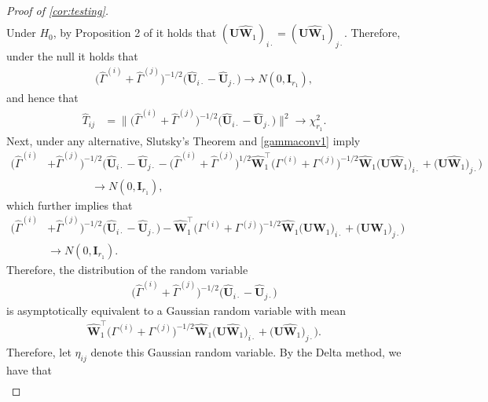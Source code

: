 \documentclass[10pt]{article}
\newcommand{\0}{{\mathbf{0}}}
\newcommand{\1}{{\mathbf{1}}}
\newcommand{\U}{{\mathbf{U}}}
\renewcommand{\citet}{\cite}
\renewcommand{\t}{^{\top}}
\newcommand{\uhat}{\mathbf{\hat{U}}}
\renewcommand{\hat}{\widehat}
\renewcommand{\hat}{\widehat}
\begin{document}
\begin{proof}[Proof of \cref{cor:testing}]
\begin{align*}
\end{align*}
Under $H_0$, by Proposition 2 of \citet{agterberg_estimating_2022} it holds that $(\U \mathbf{\hat W}_{1})_{i\cdot} = (\U \mathbf{\hat W}_{1})_{j\cdot}$.  Therefore, under the null it holds that
\begin{align*}
    \big(\hat \Gamma^{(i)} + \hat \Gamma^{(j)} \big)^{-1/2}\big( \uhat_{i\cdot} - \uhat_{j\cdot} \big) \to N(0, \mathbf{I}_{r_1}),
\end{align*}
and hence that
\begin{align*}
    \hat T_{ij} &= \|  \big(\hat \Gamma^{(i)} + \hat \Gamma^{(j)} \big)^{-1/2}\big( \uhat_{i\cdot} - \uhat_{j\cdot} \big) \|^2 \to \chi^2_{r_1}.
\end{align*}
Next, under any alternative, Slutsky's Theorem and \cref{gammaconv1} imply
\begin{align*}
    \big(\hat \Gamma^{(i)} &+ \hat \Gamma^{(j)} \big)^{-1/2}\big( \uhat_{i\cdot} - \uhat_{j\cdot}-  \big(\hat \Gamma^{(i)} + \hat \Gamma^{(j)} \big)^{1/2} \mathbf{\hat W}_{1}\t \bigg( \Gamma^{(i)} + \Gamma^{(j)} \bigg)^{-1/2}  \mathbf{\hat W}_{1}  \big(\U\mathbf{\hat W}_{1}\big)_{i\cdot} + \big( \U \mathbf{\hat W}_{1}\big)_{j\cdot} \big)\\
    &\qquad \qquad \to N(0,\mathbf{I}_{r_1}),
\end{align*}
which further implies that
\begin{align*}
     \big(\hat \Gamma^{(i)} &+ \hat \Gamma^{(j)} \big)^{-1/2}\big( \uhat_{i\cdot} - \uhat_{j\cdot} \big) -  \mathbf{\hat W}_{1}\t \bigg( \Gamma^{(i)} + \Gamma^{(j)} \bigg)^{-1/2}  \mathbf{\hat W}_{1}  \big(\U\mathbf{W}_{1}\big)_{i\cdot} + \big( \U \mathbf{W}_{1}\big)_{j\cdot} \big) \\
     &\to N(0, \mathbf{I}_{r_1}).
\end{align*}
Therefore, the distribution of the random variable
\begin{align*}
   \big(\hat \Gamma^{(i)} + \hat \Gamma^{(j)} \big)^{-1/2}\big( \uhat_{i\cdot} - \uhat_{j\cdot} \big)
\end{align*}
is asymptotically equivalent to a Gaussian random variable with mean
\begin{align*}
    \mathbf{\hat W}_{1}\t \bigg( \Gamma^{(i)} + \Gamma^{(j)} \bigg)^{-1/2}  \mathbf{\hat W}_{1}  \big(\U\mathbf{\hat W}_{1}\big)_{i\cdot} + \big( \U \mathbf{\hat W}_{1}\big)_{j\cdot} \big).
\end{align*}
Therefore, let $\eta_{ij}$ denote this Gaussian random variable. By the Delta method, we have that
\begin{align*}

\end{align*}
\end{proof}
\end{document}
